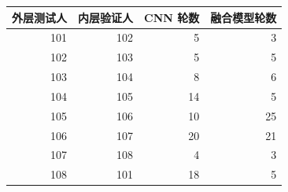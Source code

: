 \begin{tabular}{rrrr}
\toprule
外层测试人 & 内层验证人 & CNN 轮数 & 融合模型轮数 \\
\midrule
101 & 102 & 5 & 3 \\
102 & 103 & 5 & 5 \\
103 & 104 & 8 & 6 \\
104 & 105 & 14 & 5 \\
105 & 106 & 10 & 25 \\
106 & 107 & 20 & 21 \\
107 & 108 & 4 & 3 \\
108 & 101 & 18 & 5 \\
\bottomrule
\end{tabular}
